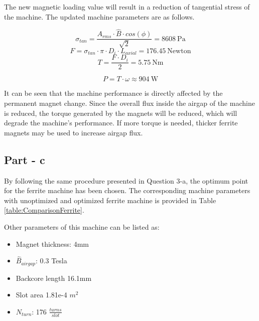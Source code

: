 \documentclass{article}
\begin{document}
The new magnetic loading value will result in a reduction of tangential stress of the machine. The updated machine parameters are as follows.

\begin{equation} \label{eqn:AverageStressNewNew}
    \sigma_{tan} = \frac{A_{rms} \cdot \hat{B} \cdot cos(\phi)}{\sqrt{2}} = 8608 \: \mathrm{Pa}
\end{equation}
\begin{equation} \label{eqn:TotalForceNewNew}
    F = \sigma_{tan} \cdot \pi \cdot D_i \cdot L_{axial} = 176.45 \: \mathrm{Newton}
\end{equation}
\begin{equation} \label{eqn:TorqueNewNew}
    T = \frac{F \cdot D_i}{2} = 5.75 \: \mathrm{Nm}
\end{equation}

\begin{equation} \label{eqn:PowerNewNew}
    P = T \cdot \omega  \approx 904 \: \mathrm{W}
\end{equation}

It can be seen that the machine performance is directly affected by the permanent magnet change. Since the overall flux inside the airgap of the machine is reduced, the torque generated by the magnets will be reduced, which will degrade the machine's performance. If more torque is needed, thicker ferrite magnets may be used to increase airgap flux.



\subsection{Part - c}
By following the same procedure presented in Question 3-a, the optimum point for the ferrite machine has been chosen. The corresponding machine parameters with unoptimized and optimized ferrite machine is provided in Table \ref{table:ComparisonFerrite}. 

Other parameters of this machine can be listed as:
\begin{itemize}
    \item Magnet thickness: 4mm
    \item $\hat{B}_{airgap}$: 0.3 Tesla
    \item Backcore length 16.1mm
    \item Slot area 1.81e-4 $m^2$
    \item $N_{turn}$: 176 $\frac{turns}{slot}$
\end{itemize}
\end{document}
